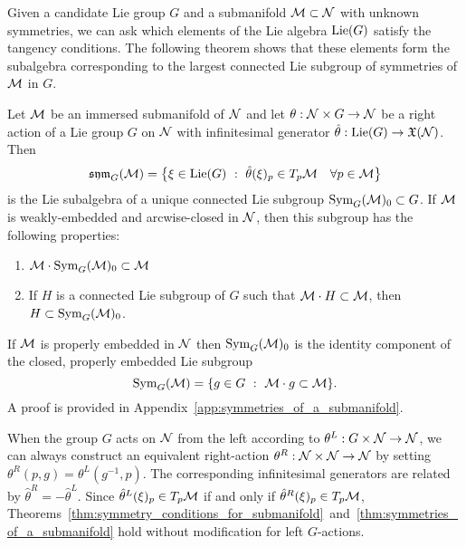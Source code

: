 \documentclass[twoside,11pt]{article}
\begin{document}
Given a candidate Lie group $G$ and a submanifold ${\mathcal{M}}\subset{\mathcal{N}}$ with unknown symmetries, we can ask which elements of the Lie algebra $\operatorname{Lie}(G)$ satisfy the tangency conditions.
The following theorem shows that these elements form the subalgebra corresponding to the largest connected Lie subgroup of symmetries of ${\mathcal{M}}$ in $G$.
\begin{theorem}
    \label{thm:symmetries_of_a_submanifold}
    Let ${\mathcal{M}}$ be an immersed submanifold of ${\mathcal{N}}$ and let $\theta: {\mathcal{N}}\times G \to {\mathcal{N}}$ be a right action of a Lie group $G$ on ${\mathcal{N}}$ with infinitesimal generator $\hat{\theta}:\operatorname{Lie}(G) \to \mathfrak{X}({\mathcal{N}})$.
    Then
    \begin{equation}
        \sym_G(\mcal{M}) = \big\{ \xi \in \Lie(G) \ : \ \hat{\theta}(\xi)_p \in T_p\mcal{M} \quad \forall p\in\mcal{M} \big\}
    \end{equation}
    is the Lie subalgebra of a unique connected Lie subgroup $\operatorname{Sym}_{G}({\mathcal{M}})_0 \subset G$.
    If ${\mathcal{M}}$ is weakly-embedded and arcwise-closed in ${\mathcal{N}}$, then this subgroup has the following properties:
    \begin{enumerate}[label=(\roman*)]
        \item ${\mathcal{M}}\cdot \operatorname{Sym}_G({\mathcal{M}})_0 \subset {\mathcal{M}}$
        \item If $H$ is a connected Lie subgroup of $G$ such that ${\mathcal{M}} \cdot H \subset {\mathcal{M}}$, then $H \subset \operatorname{Sym}_G({\mathcal{M}})_0$.
    \end{enumerate}
    If ${\mathcal{M}}$ is properly embedded in ${\mathcal{N}}$ then $\operatorname{Sym}_G({\mathcal{M}})_0$ is the identity component of the closed, properly embedded Lie subgroup
    \begin{equation}
        \operatorname{Sym}_G({\mathcal{M}}) = \{ g\in G \ : \ {\mathcal{M}} \cdot g \subset {\mathcal{M}} \}.
    \end{equation}
    A proof is provided in Appendix~\ref{app:symmetries_of_a_submanifold}.
\end{theorem}

\begin{remark}
    \label{rem:left_actions_on_manifolds}
    When the group $G$ acts on ${\mathcal{N}}$ from the left according to $\theta^L:G\times{\mathcal{N}} \to {\mathcal{N}}$, we can always construct an equivalent right-action $\theta^R:{\mathcal{N}}\times {\mathcal{N}} \to {\mathcal{N}}$ by setting
    $\theta^R(p, g) = \theta^L(g^{-1}, p)$.
    The corresponding infinitesimal generators are related by
        $\hat{\theta}^R = - \hat{\theta}^L$.
    Since $\hat{\theta}^L(\xi)_p \in T_p{\mathcal{M}}$ if and only if $\hat{\theta}^R(\xi)_p \in T_p{\mathcal{M}}$,  Theorems~\ref{thm:symmetry_conditions_for_submanifold}~and~\ref{thm:symmetries_of_a_submanifold} hold without modification for left $G$-actions.
\end{remark}
\end{document}
